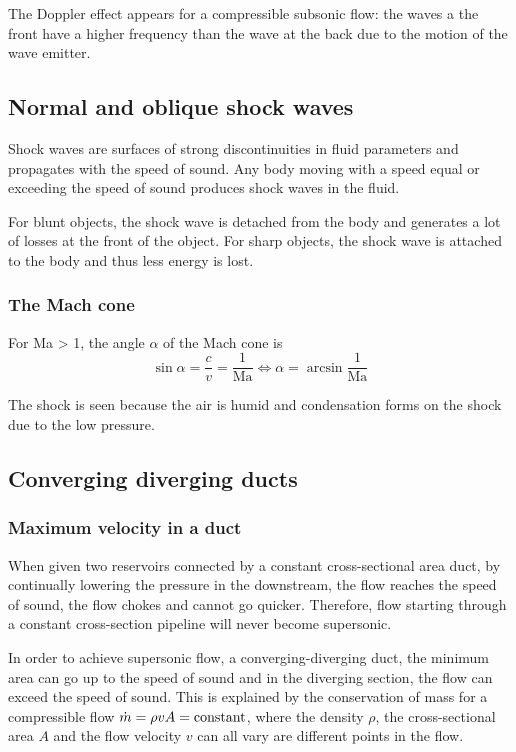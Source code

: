 \documentclass[10pt, twocolumn]{article}
\begin{document}
The Doppler effect appears for a compressible subsonic flow: the waves a the front have a higher frequency than the wave at the back due to the motion of the wave emitter.



\subsection{Normal and oblique shock waves}
Shock waves are surfaces of strong discontinuities in fluid parameters and propagates with the speed of sound.
Any body moving with a speed equal or exceeding the speed of sound produces shock waves in the fluid.

For blunt objects, the shock wave is detached from the body and generates a lot of losses at the front of the object. \newline
For sharp objects, the shock wave is attached to the body and thus less energy is lost.


\subsubsection{The Mach cone}
For Ma > 1, the angle \(\alpha\) of the Mach cone is
\[
  \sin\alpha = \frac{c}{v} = \frac{1}{\mathrm{Ma}} \iff \alpha = \arcsin\frac{1}{\mathrm{Ma}}
\]

The shock is seen because the air is humid and condensation forms on the shock due to the low pressure.


\subsection{Converging diverging ducts}
\subsubsection{Maximum velocity in a duct}
When given two reservoirs connected by a constant cross-sectional area duct, by continually lowering the pressure in the downstream, the flow reaches the speed of sound, the flow chokes and cannot go quicker. \newline
Therefore, flow starting through a constant cross-section pipeline will never become supersonic.

In order to achieve supersonic flow, a converging-diverging duct, the minimum area can go up to the speed of sound and in the diverging section, the flow can exceed the speed of sound.
This is explained by the conservation of mass for a compressible flow \(\dot{m} = \rho v A = \mathrm{constant}\), where the density \(\rho\), the cross-sectional area \(A\) and the flow velocity \(v\) can all vary are different points in the flow.
\end{document}
